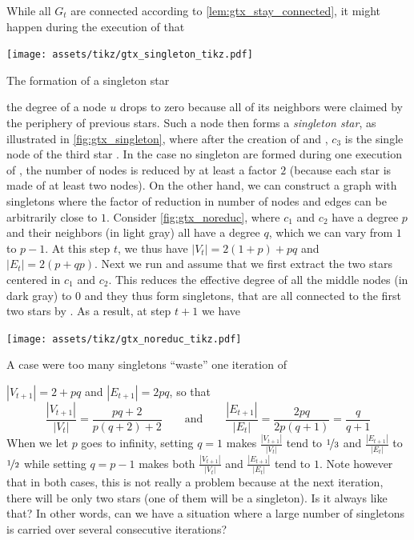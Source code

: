 While all $G_t$ are connected according to \autoref{lem:gtx_stay_connected}, it might happen during
the execution of \extractStar{} that%
\begin{marginfigure}
  \centering
  \texttt{[image: assets/tikz/gtx\_singleton\_tikz.pdf]}
  \caption{The formation of a singleton star}
  \label{fig:gtx_singleton}
\end{marginfigure}
the degree of a node $u$ drops to zero because all of its neighbors were claimed by the
periphery of previous stars. Such a node then forms a \emph{singleton star}, as illustrated in
\autoref{fig:gtx_singleton}, where after the creation of  and , $c_3$ is the
single node of the third star .
In the case no singleton are formed during one execution of \extractStar{}, the number of nodes is
reduced by at least a factor $2$ (because each star is made of at least two nodes). On the other hand, we can
construct a graph with singletons where the factor of reduction in number of nodes and edges can be
arbitrarily close to $1$. Consider \autoref{fig:gtx_noreduc}, where $c_1$ and $c_2$ have a degree
$p$ and their neighbors (in light gray) all have a degree $q$, which we can vary from $1$ to $p-1$.
At this step $t$, we thus have $|V_t| = 2(1+p)+pq$ and $|E_t| = 2(p+qp)$. Next we run \extractStar{}
and assume that we first extract the two stars centered in $c_1$ and $c_2$. This reduces the
effective degree of all the middle nodes (in dark gray) to $0$ and they thus form singletons, that
are all connected to the first two stars by \collapseStar{}. As a result, at step $t+1$ we have%
\begin{marginfigure}
  \centering
  \texttt{[image: assets/tikz/gtx\_noreduc\_tikz.pdf]}
  \caption{A case were too many singletons \enquote{waste} one iteration of \gtx{}}
  \label{fig:gtx_noreduc}
\end{marginfigure}
$|V_{t+1}| = 2 + pq$ and $|E_{t+1}| = 2pq$, so that
\begin{equation*}
\frac{|V_{t+1}|}{|V_t|} = \frac{pq+2}{p(q+2) + 2} \qquad \text{and} \qquad
\frac{|E_{t+1}|}{|E_t|} = \frac{2pq}{2p(q+1)} = \frac{q}{q+1}
\end{equation*}
When we let $p$ goes to infinity, setting $q=1$ makes $\frac{|V_{t+1}|}{|V_t|}$ tend to
$\nicefrac{1}{3}$ and $\frac{|E_{t+1}|}{|E_t|}$ to $\nicefrac{1}{2}$ while setting $q=p-1$ makes
both $\frac{|V_{t+1}|}{|V_t|}$ and $\frac{|E_{t+1}|}{|E_t|}$ tend to $1$. Note however that in both
cases, this is not really a problem because at the next iteration, there will be only two stars (one
of them will be a singleton). Is it always like that? In other words, can we have a situation where
a large number of singletons is carried over several consecutive iterations?

